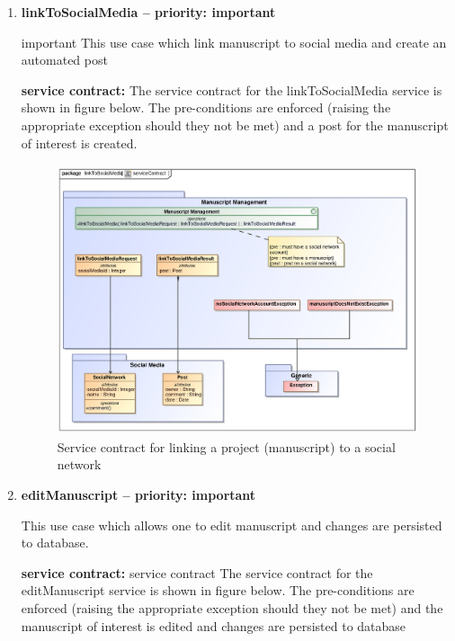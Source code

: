 \documentclass[12pt]{article}
\begin{document}
\begin{enumerate}
\item \textbf{linkToSocialMedia – priority: important}\\
\par{important  This use case which link manuscript to social media and create an automated post}

\par{\textbf{service contract:} 
The service contract for the linkToSocialMedia service is shown in figure below. The pre-conditions are enforced (raising the appropriate exception should they not be met) and a post for the manuscript of interest  is created.}

\begin{figure}[h]
\includegraphics[height=300px, width=500px]{epsImages/ManuscriptManagement/linkToSocialMedia.eps}
\caption{Service contract for linking a  project (manuscript) to a social network}
\end{figure}


\item \textbf{editManuscript – priority: important}\\
\par{This use case which allows one to edit  manuscript and changes are persisted to database.}

\par{\textbf{service contract:} 
service contract The service contract for the editManuscript service is shown in figure below. The pre-conditions are enforced (raising the appropriate exception should they not be met) and the manuscript of interest is edited and changes are persisted to database}


\end{enumerate}
\end{document}
